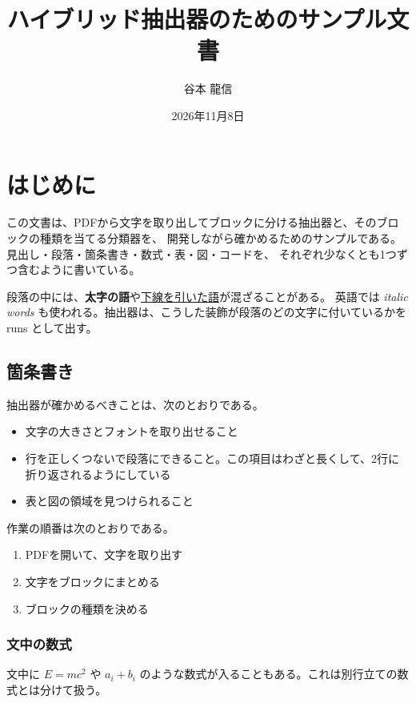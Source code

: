 \documentclass[uplatex,a4paper,11pt]{jsarticle}
\title{ハイブリッド抽出器のためのサンプル文書}
\author{谷本 龍信}
\date{2026年11月8日}
\begin{document}
\maketitle

\section{はじめに}

この文書は、PDFから文字を取り出してブロックに分ける抽出器と、そのブロックの種類を当てる分類器を、
開発しながら確かめるためのサンプルである。見出し・段落・箇条書き・数式・表・図・コードを、
それぞれ少なくとも1つずつ含むように書いている。

段落の中には、\textbf{太字の語}や\underline{下線を引いた語}が混ざることがある。
英語では \textit{italic words} も使われる。抽出器は、こうした装飾が段落のどの文字に付いているかを
runs として出す。

\subsection{箇条書き}

抽出器が確かめるべきことは、次のとおりである。
\begin{itemize}
  \item 文字の大きさとフォントを取り出せること
  \item 行を正しくつないで段落にできること。この項目はわざと長くして、2行に折り返されるようにしている
  \item 表と図の領域を見つけられること
\end{itemize}

作業の順番は次のとおりである。
\begin{enumerate}
  \item PDFを開いて、文字を取り出す
  \item 文字をブロックにまとめる
  \item ブロックの種類を決める
\end{enumerate}

\subsubsection{文中の数式}

文中に $E = mc^2$ や $a_i + b_i$ のような数式が入ることもある。これは別行立ての数式とは分けて扱う。
\end{document}
